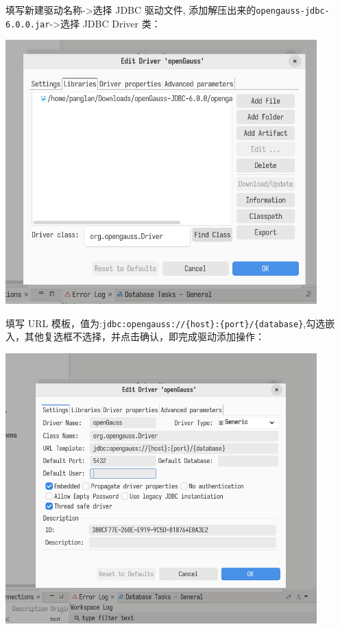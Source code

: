 \documentclass{article}
\begin{document}
填写新建驱动名称->选择 JDBC 驱动文件, 添加解压出来的\verb|opengauss-jdbc-6.0.0.jar|->选择 JDBC Driver 类：

\begin{center}
\includegraphics[width=12cm]{./image/3.png}
\end{center}

填写 URL 模板，值为:\verb|jdbc:opengauss://{host}:{port}/{database}|,勾选嵌入，其他复选框不选择，并点击确认，即完成驱动添加操作：

\begin{center}
\includegraphics[width=12cm]{./image/2.png}
\end{center}
\end{document}

